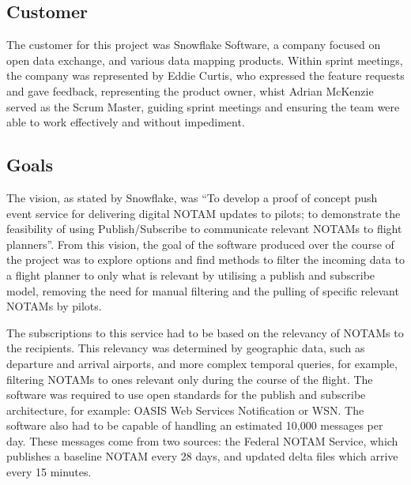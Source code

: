 \documentclass[a4paper, 12pt, twoside]{article}
\begin{document}
\subsection{Customer}
\label{sec:intro_customer}

The customer for this project was Snowflake Software, a company focused on open data exchange, and various data mapping products. Within sprint meetings, the company was represented by Eddie Curtis, who expressed the feature requests and gave feedback, representing the product owner, whist Adrian McKenzie served as the Scrum Master, guiding sprint meetings and ensuring the team were able to work effectively and without impediment.

\subsection{Goals}
\label{sec:intro_goals}

The vision, as stated by Snowflake, was ``To develop a proof of concept push event service for delivering digital NOTAM updates to pilots; to demonstrate the feasibility of using Publish/Subscribe to communicate relevant NOTAMs to flight planners''. From this vision, the goal of the software produced over the course of the project was to explore options and find methods to filter the incoming data to a flight planner to only what is relevant by utilising a publish and subscribe model, removing the need for manual filtering and the pulling of specific relevant NOTAMs by pilots.

The subscriptions to this service had to be based on the relevancy of NOTAMs to the recipients. This relevancy was determined by geographic data, such as departure and arrival airports, and more complex temporal queries, for example, filtering NOTAMs to ones relevant only during the course of the flight. The software was required to use open standards for the publish and subscribe architecture, for example: OASIS Web Services Notification or WSN. The software also had to be capable of handling an estimated 10,000 messages per day. These messages come from two sources: the Federal NOTAM Service, which publishes a baseline NOTAM every 28 days, and updated delta files which arrive every 15 minutes.
\end{document}
